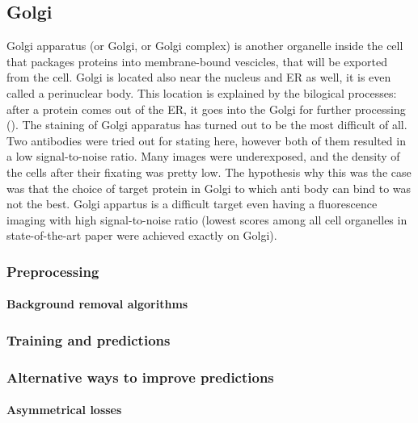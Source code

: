 \subsection{Golgi}
    Golgi apparatus (or Golgi, or Golgi complex) is another organelle inside the cell that packages proteins into membrane-bound vescicles, that will be exported from the cell. Golgi is located also near the nucleus and ER as well, it is even called a perinuclear body. This location is explained by the bilogical processes: after a protein comes out of the ER, it goes into the Golgi for further processing (\cite{golgi}). The staining of Golgi apparatus has turned out to be the most difficult of all. Two antibodies were tried out for stating here, however both of them resulted in a low signal-to-noise ratio. Many images were underexposed, and the density of the cells after their fixating was pretty low. The hypothesis why this was the case was that the choice of target protein in Golgi to which anti body can bind to was not the best. Golgi appartus is a difficult target even having a fluorescence imaging with high signal-to-noise ratio (lowest scores among all cell organelles in state-of-the-art \cite{Cheng_2021} paper were achieved exactly on Golgi).
    \subsubsection{Preprocessing}
        
        \paragraph{Background removal algorithms}
            \label{par:background-removal}
            
    \subsubsection{Training and predictions}
        

    \subsubsection{Alternative ways to improve predictions}
        \paragraph{Asymmetrical losses}
            
